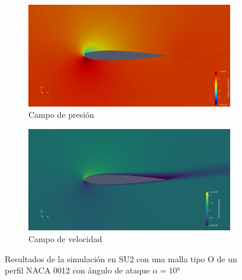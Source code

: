 \documentclass[letterpaper, openright, 12pt]{book}
\begin{document}
    \begin{figure}[htbp!]
        \centering
        \begin{subfigure}[c]{0.48\textwidth}
            \includegraphics[keepaspectratio, width=0.99\textwidth]
                {./img/su2/mo_cp_alfa_10}
            \caption{Campo de presión}
            \label{fig:mo_cp_10}
        \end{subfigure}
        \begin{subfigure}[c]{0.48\textwidth}
            \includegraphics[keepaspectratio, width=0.99\textwidth]
                {./img/su2/mo_vel_alfa_10}
            \caption{Campo de velocidad}
            \label{fig:mo_vel_10}
        \end{subfigure}
        \caption[Resultados de simulaciones para malla O en SU2]{Resultados de
            la simulación en SU2 con una malla tipo O de un perfil NACA 0012
            con ángulo de ataque $\alpha = 10\si{\degree}$}
            \label{fig:mo_su2_10}
    \end{figure}
\end{document}
